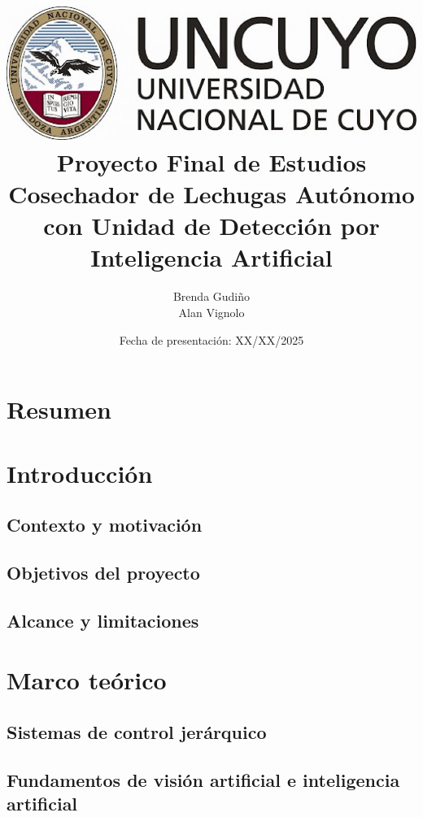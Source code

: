 \documentclass[a4paper,12pt]{report}
\title{
\includegraphics[scale = 0.3]{logo_uncuyo.png} \\ [2cm]
{\Huge \textbf{Proyecto Final de Estudios} \\ [1cm] 
Cosechador de Lechugas Autónomo con Unidad de Detección por Inteligencia Artificial}}
\author{Brenda Gudiño \\ Alan Vignolo}
\date{{Fecha de presentación: XX/XX/2025}}
\begin{document}

\maketitle
\tableofcontents 
\newpage

\chapter*{Resumen}


\chapter{Introducción}

\section{Contexto y motivación}

\newpage
\section{Objetivos del proyecto}


\section{Alcance y limitaciones}


\chapter{Marco teórico}

\section{Sistemas de control jerárquico}


\section{Fundamentos de visión artificial e inteligencia artificial}





\end{document}
